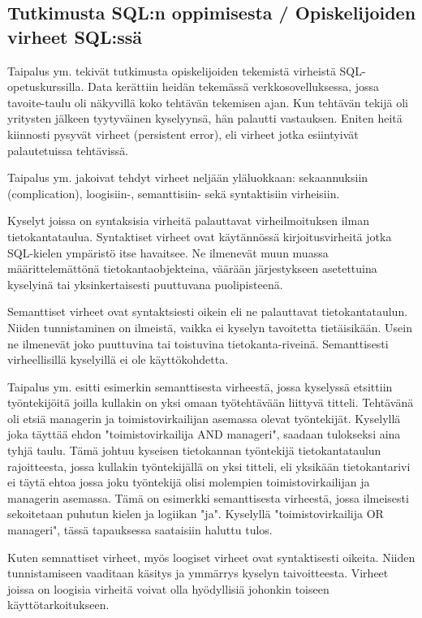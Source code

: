 \documentclass[finnish,twoside,openright]{HYgraduMLDS}
\begin{document}
\subsection{Tutkimusta SQL:n oppimisesta / Opiskelijoiden virheet SQL:ssä}

Taipalus ym. \cite{Taipalus:2019:EFS:3287324.3287359} tekivät tutkimusta opiskelijoiden tekemistä virheistä SQL-opetuskurssilla. Data kerättiin heidän tekemässä verkkosovelluksessa, jossa tavoite-taulu oli näkyvillä koko tehtävän tekemisen ajan. Kun tehtävän tekijä oli yritysten jälkeen tyytyväinen kyselyynsä, hän palautti vastauksen. Eniten heitä kiinnosti pysyvät virheet (persistent error), eli virheet jotka esiintyivät palautetuissa tehtävissä. 

Taipalus ym. \cite{Taipalus:2019:EFS:3287324.3287359} jakoivat tehdyt virheet neljään yläluokkaan: sekaannuksiin (complication), loogisiin-, semanttisiin- sekä syntaktisiin virheisiin. 

Kyselyt joissa on syntaksisia virheitä palauttavat virheilmoituksen ilman tietokantataulua. Syntaktiset virheet ovat käytännössä kirjoitusvirheitä jotka SQL-kielen ympäristö itse havaitsee. Ne ilmenevät muun muassa määrittelemättönä tietokantaobjekteina, väärään järjestykseen asetettuina kyselyinä tai yksinkertaisesti puuttuvana puolipisteenä.

Semanttiset virheet ovat syntaktsiesti oikein eli ne palauttavat tietokantataulun. Niiden tunnistaminen on ilmeistä, vaikka ei kyselyn tavoitetta tietäisikään. Usein ne ilmenevät joko puuttuvina tai toistuvina tietokanta-riveinä. Semanttisesti virheellisillä kyselyillä ei ole käyttökohdetta. 

Taipalus ym. \cite{taipalus2018errors} esitti esimerkin semanttisesta virheestä, jossa kyselyssä etsittiin työntekijöitä joilla kullakin on yksi omaan työtehtävään liittyvä titteli. Tehtävänä oli etsiä managerin ja toimistovirkailijan asemassa olevat työntekijät. Kyselyllä joka täyttää ehdon "toimistovirkailija AND manageri", saadaan tulokseksi aina tyhjä taulu. Tämä johtuu kyseisen tietokannan työntekijä tietokantataulun rajoitteesta, jossa kullakin työntekijällä on yksi titteli, eli yksikään tietokantarivi ei täytä ehtoa jossa joku työntekijä olisi molempien toimistovirkailijan ja managerin asemassa. Tämä on esimerkki semanttisesta virheestä, jossa ilmeisesti sekoitetaan puhutun kielen ja logiikan "ja". Kyselyllä "toimistovirkailija OR manageri", tässä tapauksessa  saataisiin haluttu tulos.

Kuten semnattiset virheet, myös loogiset virheet ovat syntaktisesti oikeita. Niiden tunnistamiseen vaaditaan käsitys ja ymmärrys kyselyn taivoitteesta. Virheet joissa on loogisia virheitä voivat olla hyödyllisiä johonkin toiseen käyttötarkoitukseen. 
\end{document}
